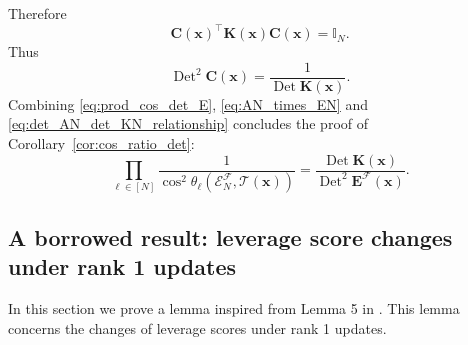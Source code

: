 \documentclass[twoside,11pt]{book}
\numberwithin{theorem}{chapter}
\numberwithin{definition}{chapter}
\numberwithin{proposition}{chapter}
\numberwithin{corollary}{chapter}
\numberwithin{example}{chapter}
\numberwithin{lemma}{chapter}
\numberwithin{assumption}{chapter}
\DeclareMathOperator{\Det}{Det}
\DeclareMathOperator{\Tran}{\intercal}
\begin{document}
Therefore
\begin{equation}
\bm{C}(\bm{x})^{\Tran} \bm{K}(\bm{x}) \bm{C}(\bm{x}) = \mathbb{I}_{N}.
\end{equation}
Thus
\begin{equation}\label{eq:det_AN_det_KN_relationship}
\Det^{2} \bm{C}(\bm{x}) = \frac{1}{\Det \bm{K}(\bm{x})}.
\end{equation}
Combining \eqref{eq:prod_cos_det_E}, \eqref{eq:AN_times_EN} and \eqref{eq:det_AN_det_KN_relationship} concludes the proof of Corollary~\ref{cor:cos_ratio_det}:
\begin{equation}
\prod\limits_{\ell \in [N]} \frac{1}{\cos^{2} \theta_{\ell} \left(\mathcal{E}^{\mathcal{F}}_{N}, \mathcal{T}(\bm{x}) \right)} = \frac{\Det \bm{K}(\bm{x})}{\Det^{2} \bm{E}^{\mathcal{F}}(\bm{x})}.
\end{equation}


\subsection{A borrowed result: leverage score changes under rank 1 updates} \label{subsec:lv_score_updates}


In this section we prove a lemma inspired from Lemma 5 in \cite{Coh15}. This lemma concerns the changes of leverage scores under rank 1 updates.
\end{document}
